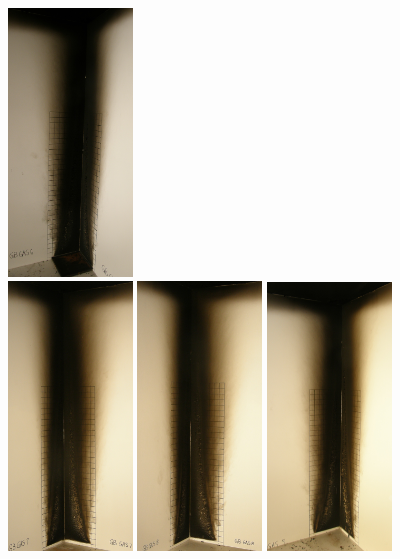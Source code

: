 \documentclass[twoside]{uocthesis}
\begin{document}
\begin{figure}[p]
	\includegraphics[width=1.3in]{../Figures/GBGas6C_P5270526} \\

	\includegraphics[width=1.3in]{../Figures/GBGas7C_P5270587}
	\includegraphics[width=1.3in]{../Figures/GBGas8C_P5270629}
	\includegraphics[width=1.3in]{../Figures/GBGas9C_P5270689}

\end{figure}
\end{document}
